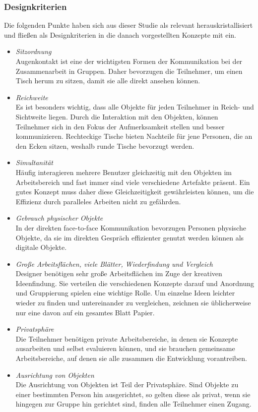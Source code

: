 \subsubsection{Designkriterien} 

Die folgenden Punkte haben sich aus dieser Studie als relevant herauskristallisiert und fließen als Designkriterien in die danach vorgestellten Konzepte mit ein.

\begin{itemize} 
	\item{\emph{Sitzordnung}}\\
	Augenkontakt ist eine der wichtigsten Formen der Kommunikation bei der Zusammenarbeit in Gruppen. Daher bevorzugen die Teilnehmer, um einen Tisch herum zu sitzen, damit sie alle direkt ansehen können.
	\item{\emph{Reichweite}}\\
	Es ist besonders wichtig, dass alle Objekte für jeden Teilnehmer in Reich- und Sichtweite liegen. Durch die Interaktion mit den Objekten, können Teilnehmer sich in den Fokus der Aufmerksamkeit stellen und besser kommunizieren. Rechteckige Tische bieten Nachteile für jene Personen, die an den Ecken sitzen, weshalb runde Tische bevorzugt werden.
	\item{\emph{Simultanität}}\\
	Häufig interagieren mehrere Benutzer gleichzeitig mit den Objekten im Arbeitsbereich und fast immer sind viele verschiedene Artefakte präsent. Ein gutes Konzept muss daher diese Gleichzeitigkeit gewährleisten können, um die Effizienz durch paralleles Arbeiten nicht zu gefährden.
	\item{\emph{Gebrauch physischer Objekte}}\\
	In der direkten face-to-face Kommunikation bevorzugen Personen physische Objekte, da sie im direkten Gespräch effizienter genutzt werden können als digitale Objekte.
	\item{\emph{Große Arbeitsflächen, viele Blätter, Wiederfindung und Vergleich}}\\
	Designer benötigen sehr große Arbeitsflächen im Zuge der kreativen Ideenfindung. Sie verteilen die verschiedenen Konzepte darauf und Anordnung und Gruppierung spielen eine wichtige Rolle. Um einzelne Ideen leichter wieder zu finden und untereinander zu vergleichen, zeichnen sie üblicherweise nur eine davon auf ein gesamtes Blatt Papier.
	\item{\emph{Privatsphäre}}\\
	Die Teilnehmer benötigen private Arbeitsbereiche, in denen sie Konzepte ausarbeiten und selbst evaluieren können, und sie brauchen gemeinsame Arbeitsbereiche, auf denen sie alle zusammen die Entwicklung vorantreiben.
	\item{\emph{Ausrichtung von Objekten}}\\
	Die Ausrichtung von Objekten ist Teil der Privatsphäre. Sind Objekte zu einer bestimmten Person hin ausgerichtet, so gelten diese als privat, wenn sie hingegen zur Gruppe hin gerichtet sind, finden alle Teilnehmer einen Zugang.
\end{itemize}

